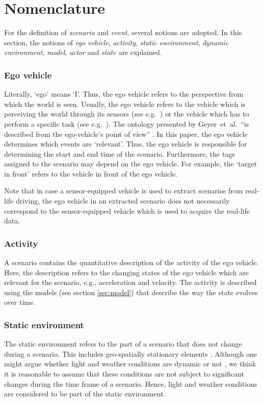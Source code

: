 \section{Nomenclature}
\label{sec:nomenclature}

For the definition of \emph{scenario} and \emph{event}, several notions are adopted. In this section, the notions of \emph{ego vehicle}, \emph{activity}, \emph{static environment}, \emph{dynamic environment}, \emph{model}, \emph{actor} and \emph{state} are explained. 

\subsubsection{Ego vehicle}
\label{sec:ego vehicle}
Literally, `ego' means `I'. Thus, the ego vehicle refers to the perspective from which the world is seen. Usually, the ego vehicle refers to the vehicle which is perceiving the world through its sensors (see e.g.~\cite{Bonnin2014}) or the vehicle which has to perform a specific task (see e.g.~\cite{althoff2017CommonRoad}). The ontology presented by Geyer~et~al.\ ``is described from the ego-vehicle’s point of view'' \cite{geyer2014}. In this paper, the ego vehicle determines which events are `relevant'. Thus, the ego vehicle is responsible for determining the start and end time of the scenario. Furthermore, the tags assigned to the scenario may depend on the ego vehicle. For example, the `target in front' refers to the vehicle in front of the ego vehicle. 

Note that in case a sensor-equipped vehicle is used to extract scenarios from real-life driving, the ego vehicle in an extracted scenario does not necessarily correspond to the sensor-equipped vehicle which is used to acquire the real-life data.

\subsubsection{Activity}
\label{sec:activity}
A scenario contains the quantitative description of the activity of the ego vehicle. Here, the description refers to the changing states of the ego vehicle which are relevant for the scenario, e.g., acceleration and velocity. The activity is described using the models (see section \ref{sec:model}) that describe the way the state evolves over time.

\subsubsection{Static environment}
\label{sec:static environment}
The static environment refers to the part of a scenario that does not change during a scenario. This includes geo-spatially stationary elements \cite{ulbrich2015}. Although one might argue whether light and weather conditions are dynamic or not \cite{geyer2014,bach2016modelbased}, we think it is reasonable to assume that these conditions are not subject to significant changes during the time frame of a scenario. Hence, light and weather conditions are considered to be part of the static environment.

